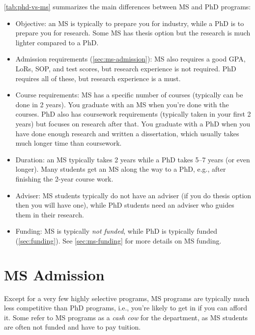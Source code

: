 \documentclass[oneside,11pt,dvipsnames]{book}
\begin{document}
\autoref{tab:phd-vs-ms} summarizes the main differences between MS and PhD programs:
\begin{itemize}

  \item Objective: an MS is typically to prepare you for industry, while a PhD is to prepare you for research. Some MS has thesis option but the research is much lighter compared to a PhD.

  \item Admission requirements (\autoref{sec:ms-admission}): MS also requires a good GPA, LoRs, SOP, and test scores, but research experience is not required.  PhD requires all of these, but research experience is a must.
  
  \item Course requirements: MS has a specific number of courses (typically can be done in 2 years). You graduate with an MS when you're done with the courses. PhD also has coursework requirements (typically taken in your first 2 years) but focuses on research after that.  You graduate with a PhD when you have done enough research and written a dissertation, which usually takes much longer time than coursework.
  
  \item Duration: an MS typically takes 2 years while a PhD takes 5--7 years (or even longer).  Many students get an MS along the way to a PhD, e.g., after finishing the 2-year course work.
  
  \item Adviser: MS students typically do not have an adviser (if you do thesis option then you will have one), while PhD students need an adviser who guides them in their research.
  
  \item Funding: MS is typically \emph{not funded}, while PhD is typically funded (\autoref{sec:funding}). See \autoref{sec:ms-funding} for more details on MS funding.
  
\end{itemize}

\section{MS Admission}\label{sec:ms-admission}

Except for a very few highly selective programs, MS programs are typically much less competitive than PhD programs, i.e., you're likely to get in if you can afford it. Some refer to MS programs as a \emph{cash cow} for the department, as MS students are often not funded and have to pay tuition.
\end{document}
